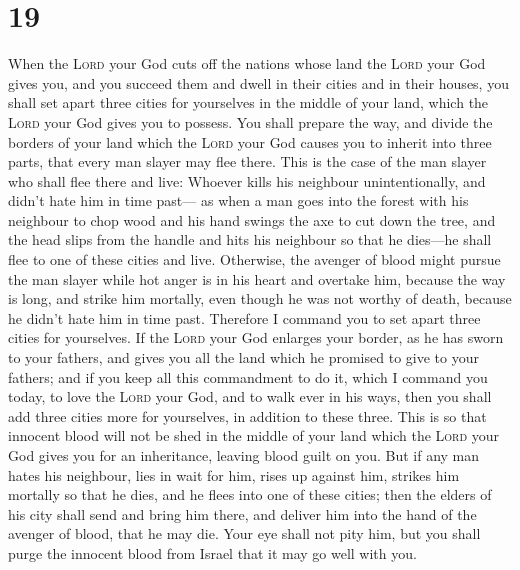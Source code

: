 \hypertarget{section-18}{%
\section{19}\label{section-18}}

 When the \textsc{Lord} your God cuts off the nations
whose land the \textsc{Lord} your God gives you, and you succeed them
and dwell in their cities and in their houses,  you shall
set apart three cities for yourselves in the middle of your land, which
the \textsc{Lord} your God gives you to possess.  You
shall prepare the way, and divide the borders of your land which the
\textsc{Lord} your God causes you to inherit into three parts, that
every man slayer may flee there.  This is the case of the
man slayer who shall flee there and live: Whoever kills his neighbour
unintentionally, and didn't hate him in time past---  as
when a man goes into the forest with his neighbour to chop wood and his
hand swings the axe to cut down the tree, and the head slips from the
handle and hits his neighbour so that he dies---he shall flee to one of
these cities and live.  Otherwise, the avenger of blood
might pursue the man slayer while hot anger is in his heart and overtake
him, because the way is long, and strike him mortally, even though he
was not worthy of death, because he didn't hate him in time past.
 Therefore I command you to set apart three cities for
yourselves.  If the \textsc{Lord} your God enlarges your
border, as he has sworn to your fathers, and gives you all the land
which he promised to give to your fathers;  and if you
keep all this commandment to do it, which I command you today, to love
the \textsc{Lord} your God, and to walk ever in his ways, then you shall
add three cities more for yourselves, in addition to these three.
 This is so that innocent blood will not be shed in the
middle of your land which the \textsc{Lord} your God gives you for an
inheritance, leaving blood guilt on you.  But if any man
hates his neighbour, lies in wait for him, rises up against him, strikes
him mortally so that he dies, and he flees into one of these cities;
 then the elders of his city shall send and bring him
there, and deliver him into the hand of the avenger of blood, that he
may die.  Your eye shall not pity him, but you shall
purge the innocent blood from Israel that it may go well with you.

